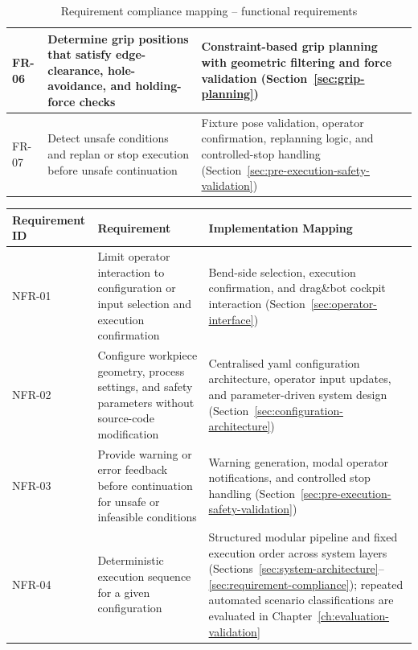 \begin{landscape}
\begin{table}[p]
\begin{tabular}{
L{3.0cm}
L{6.8cm}
L{12.2cm}
}
FR-06 & Determine grip positions that satisfy edge-clearance, hole-avoidance, and holding-force checks &
Constraint-based grip planning with geometric filtering and force validation (Section~\ref{sec:grip-planning}) \\
\hline

FR-07 & Detect unsafe conditions and replan or stop execution before unsafe continuation &
Fixture pose validation, operator confirmation, replanning logic, and controlled-stop handling (Section~\ref{sec:pre-execution-safety-validation}) \\

\hline
\end{tabular}

\caption{Requirement compliance mapping -- functional requirements}
\label{tab:req-compliance}

\end{table}


\begin{table}[p]
\centering
\normalsize
\setlength{\tabcolsep}{3pt}
\renewcommand{\arraystretch}{1.08}

\begin{tabular}{
L{3.0cm}
L{6.8cm}
L{12.2cm}
}
\hline
\textbf{Requirement ID} &
\textbf{Requirement} &
\textbf{Implementation Mapping} \\
\hline

NFR-01 & Limit operator interaction to configuration or input selection and execution confirmation &
Bend-side selection, execution confirmation, and drag\&bot cockpit interaction (Section~\ref{sec:operator-interface}) \\
\hline

NFR-02 & Configure workpiece geometry, process settings, and safety parameters without source-code modification &
Centralised \acs{yaml} configuration architecture, operator input updates, and parameter-driven system design (Section~\ref{sec:configuration-architecture}) \\
\hline

NFR-03 & Provide warning or error feedback before continuation for unsafe or infeasible conditions &
Warning generation, modal operator notifications, and controlled stop handling (Section~\ref{sec:pre-execution-safety-validation}) \\
\hline

NFR-04 & Deterministic execution sequence for a given configuration &
Structured modular pipeline and fixed execution order across system layers (Sections~\ref{sec:system-architecture}--\ref{sec:requirement-compliance}); repeated automated scenario classifications are evaluated in Chapter~\ref{ch:evaluation-validation} \\
\hline


\end{tabular}
\end{table}
\end{landscape}
